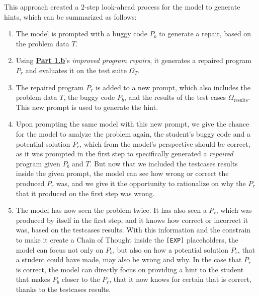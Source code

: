 \documentclass{article}
\begin{document}
This approach created a 2-step look-ahead process for the model to generate hints, which can be summarized as follows:
\begin{enumerate}
    \item The model is prompted with a buggy code $P_b$ to generate a repair, based on the problem data $T$.
    \item Using \hyperref[part-b]{\textbf{Part 1.b}}'s \textit{improved program repairs}, it generates a repaired program $P_r$ and evaluates it on the test suite $\Omega_T$.
    \item The repaired program $P_r$ is added to a new prompt, which also includes the problem data $T$, the buggy code $P_b$, and the results of the test cases $\Omega_{\text{results}}$. This new prompt is used to generate the hint.
    \item Upon prompting the same model with this new prompt, we give the chance for the model to analyze the problem again, the student's buggy code and a potential solution $P_r$, which from the model's perspective should be correct, as it was prompted in the first step to specifically generated a \textit{repaired} program given $P_b$ and $T$. But now that we included the testcases results inside the given prompt, the model can see how wrong or correct the produced $P_r$ was, and we give it the opportunity to rationalize on why the $P_r$ that it produced on the first step was wrong.
    \item The model has now seen the problem twice. It has also seen a $P_r$, which was produced by itself in the first step, and it knows how correct or incorrect it was, based on the testcases results. With this information and the constrain to make it create a Chain of Thought inside the \texttt{[EXP]} placeholders, the model can focus not only on $P_b$, but also on how a potential solution $P_r$, that a student could have made, may also be wrong and why. In the case that $P_r$ is correct, the model can directly focus on providing a hint to the student that makes $P_b$ closer to the $P_r$, that it now knows for certain that is correct, thanks to the testcases results.
\end{enumerate}
\end{document}
